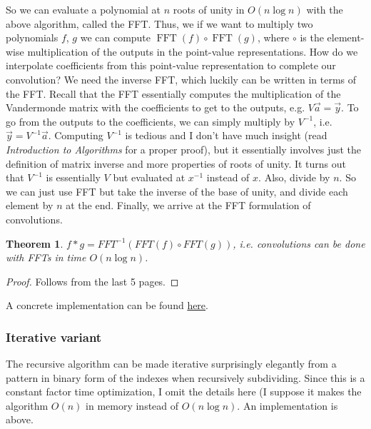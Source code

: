 \documentclass[11pt, oneside]{article}
\theoremstyle{plain}
\newtheorem{theorem}{Theorem}[section]
\theoremstyle{definition}
\DeclareMathOperator{\FFT}{FFT}
\begin{document}
So we can evaluate a polynomial at \( n \) roots of unity in \( O(n \log n) \)
with the above algorithm, called the FFT.
Thus, we if we want to multiply two polynomials \( f \), \( g \) we can compute
\( \FFT(f) \circ \FFT(g) \), where \( \circ \) is the element-wise multiplication
of the outputs in the point-value representations.
How do we interpolate coefficients from this point-value representation to
complete our convolution? We need the inverse FFT, which luckily can be written
in terms of the FFT. Recall that the FFT essentially computes the 
multiplication of the Vandermonde matrix with the coefficients to get to the
outputs, e.g. \( V \vec{a} = \vec{y} \). To go from the outputs to the
coefficients, we can simply multiply by \( V^{-1} \), i.e.
\( \vec{y} = V^{-1} \vec{a} \). Computing \( V^{-1} \) is tedious and I don't
have much insight (read \textit{Introduction to Algorithms} for a proper proof),
but it essentially involves just the definition of matrix inverse and more
properties of roots of unity. It turns out that \( V^{-1} \) is essentially
\( V \) but evaluated at \( x^{-1} \) instead of \( x \).
Also, divide by \( n \). So we can just use FFT but take the inverse of the
base of unity, and divide each element by \( n \) at the end.
Finally, we arrive at the FFT formulation of convolutions.
\begin{theorem}
  \( f * g = FFT^{-1}(FFT(f) \circ FFT(g)) \), i.e. convolutions 
  can be done with FFTs in time \( O(n \log n) \).
\end{theorem}
\begin{proof}
Follows from the last 5 pages.
\end{proof}

A concrete implementation can be found 
\href{https://gist.github.com/stephen-huan/aa609965c86d750736398c28b025f9be#fast-fourier-transform}{here}.

\subsubsection{Iterative variant}
The recursive algorithm can be made iterative surprisingly elegantly from a
pattern in binary form of the indexes when recursively subdividing.
Since this is a constant factor time optimization, I omit the details here
(I suppose it makes the algorithm \( O(n) \) in memory instead of
\( O(n \log n) \). An implementation is above.
\end{document}
